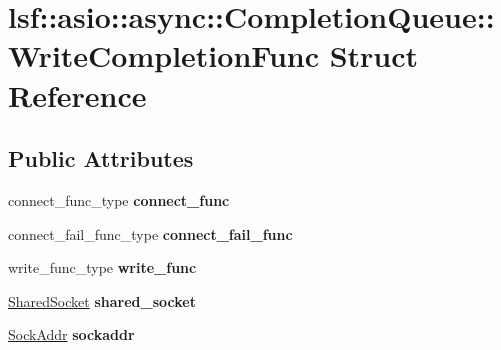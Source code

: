 \hypertarget{structlsf_1_1asio_1_1async_1_1CompletionQueue_1_1WriteCompletionFunc}{
\section{lsf::asio::async::CompletionQueue::WriteCompletionFunc Struct Reference}
\label{structlsf_1_1asio_1_1async_1_1CompletionQueue_1_1WriteCompletionFunc}
}
\subsection*{Public Attributes}
\begin{DoxyCompactItemize}
\item 
\hypertarget{structlsf_1_1asio_1_1async_1_1CompletionQueue_1_1WriteCompletionFunc_a4593d707f7a72eb79b605a26ad2e365e}{
connect\_\-func\_\-type {\bfseries connect\_\-func}}
\label{structlsf_1_1asio_1_1async_1_1CompletionQueue_1_1WriteCompletionFunc_a4593d707f7a72eb79b605a26ad2e365e}

\item 
\hypertarget{structlsf_1_1asio_1_1async_1_1CompletionQueue_1_1WriteCompletionFunc_aad91f9ebb776931feebe00b7e43301cb}{
connect\_\-fail\_\-func\_\-type {\bfseries connect\_\-fail\_\-func}}
\label{structlsf_1_1asio_1_1async_1_1CompletionQueue_1_1WriteCompletionFunc_aad91f9ebb776931feebe00b7e43301cb}

\item 
\hypertarget{structlsf_1_1asio_1_1async_1_1CompletionQueue_1_1WriteCompletionFunc_adf38462462be54b243c05c9580a05cce}{
write\_\-func\_\-type {\bfseries write\_\-func}}
\label{structlsf_1_1asio_1_1async_1_1CompletionQueue_1_1WriteCompletionFunc_adf38462462be54b243c05c9580a05cce}

\item 
\hypertarget{structlsf_1_1asio_1_1async_1_1CompletionQueue_1_1WriteCompletionFunc_aff240844a59d39eaccaa666df219a80b}{
\hyperlink{classlsf_1_1asio_1_1SharedSocket}{SharedSocket} {\bfseries shared\_\-socket}}
\label{structlsf_1_1asio_1_1async_1_1CompletionQueue_1_1WriteCompletionFunc_aff240844a59d39eaccaa666df219a80b}

\item 
\hypertarget{structlsf_1_1asio_1_1async_1_1CompletionQueue_1_1WriteCompletionFunc_aaf2437786d1cfef660a598e0a73bb410}{
\hyperlink{classlsf_1_1asio_1_1SockAddr}{SockAddr} {\bfseries sockaddr}}
\label{structlsf_1_1asio_1_1async_1_1CompletionQueue_1_1WriteCompletionFunc_aaf2437786d1cfef660a598e0a73bb410}


\end{DoxyCompactItemize}
